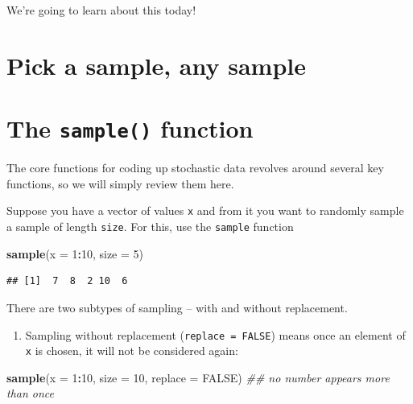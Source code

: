 \documentclass[
]{book}
\newenvironment{Shaded}{\begin{snugshade}}{\end{snugshade}}
\newcommand{\CommentTok}[1]{\textcolor[rgb]{0.56,0.35,0.01}{\textit{#1}}}
\newcommand{\DataTypeTok}[1]{\textcolor[rgb]{0.13,0.29,0.53}{#1}}
\newcommand{\DecValTok}[1]{\textcolor[rgb]{0.00,0.00,0.81}{#1}}
\newcommand{\KeywordTok}[1]{\textcolor[rgb]{0.13,0.29,0.53}{\textbf{#1}}}
\newcommand{\NormalTok}[1]{#1}
\newcommand{\OperatorTok}[1]{\textcolor[rgb]{0.81,0.36,0.00}{\textbf{#1}}}
\newcommand{\OtherTok}[1]{\textcolor[rgb]{0.56,0.35,0.01}{#1}}
\providecommand{\tightlist}{%
  \setlength{\itemsep}{0pt}\setlength{\parskip}{0pt}}
\theoremstyle{definition}
\theoremstyle{definition}
\theoremstyle{definition}
\theoremstyle{definition}
\theoremstyle{remark}
\begin{document}
We're going to learn about this today!

\hypertarget{pick-a-sample-any-sample}{%
\section{Pick a sample, any sample}\label{pick-a-sample-any-sample}}

\hypertarget{the-sample-function}{%
\section{\texorpdfstring{The \texttt{sample()} function}{The sample() function}}\label{the-sample-function}}

The core functions for coding up stochastic data revolves around several key functions, so we will simply review them here.

Suppose you have a vector of values \texttt{x} and from it you want to randomly sample a sample of length \texttt{size}. For this, use the \texttt{sample} function

\begin{Shaded}
\begin{Highlighting}[]
\KeywordTok{sample}\NormalTok{(}\DataTypeTok{x =} \DecValTok{1}\OperatorTok{:}\DecValTok{10}\NormalTok{, }\DataTypeTok{size =} \DecValTok{5}\NormalTok{)}
\end{Highlighting}
\end{Shaded}

\begin{verbatim}
## [1]  7  8  2 10  6
\end{verbatim}

There are two subtypes of sampling -- with and without replacement.

\begin{enumerate}
\def\labelenumi{\arabic{enumi}.}
\tightlist
\item
  Sampling without replacement (\texttt{replace\ =\ FALSE}) means once an element of \texttt{x} is chosen, it will not be considered again:
\end{enumerate}

\begin{Shaded}
\begin{Highlighting}[]
\KeywordTok{sample}\NormalTok{(}\DataTypeTok{x =} \DecValTok{1}\OperatorTok{:}\DecValTok{10}\NormalTok{, }\DataTypeTok{size =} \DecValTok{10}\NormalTok{, }\DataTypeTok{replace =} \OtherTok{FALSE}\NormalTok{) }\CommentTok{## no number appears more than once}
\end{Highlighting}
\end{Shaded}
\end{document}
